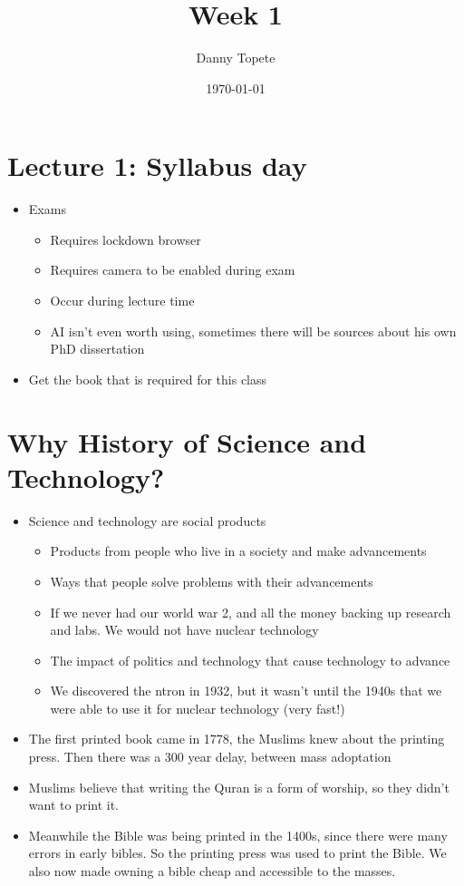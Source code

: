 \documentclass{article}
\title{Week 1}
\author{Danny Topete}
\date{\today}
\begin{document}
\maketitle

\section{Lecture 1: Syllabus day}
\begin{itemize}
  \item Exams
    \begin{itemize}
      \item Requires lockdown browser
      \item Requires camera to be enabled during exam
      \item Occur during lecture time
      \item AI isn't even worth using, sometimes
        there will be sources about his own PhD dissertation
    \end{itemize}
  \item Get the book that is required for this class
\end{itemize}

\section*{Why History of Science and Technology?}
\begin{itemize}
  \item Science and technology are social products
    \begin{itemize}
      \item Products from people who live in a society and make
        advancements
      \item Ways that people solve problems with their advancements
      \item If we never had our world war 2, and all the
        money backing up research and labs.
        We would not have nuclear technology
      \item The impact of politics and technology that
        cause technology to advance
      \item We discovered the ntron in 1932, but
        it wasn't until the 1940s that we were able to
        use it for nuclear technology (very fast!)
    \end{itemize}
  \item The first printed book came in 1778,
    the Muslims knew about the printing press.
    Then there was a 300 year delay, between mass adoptation
  \item Muslims believe that writing the Quran
    is a form of worship, so they didn't want to
    print it.
  \item Meanwhile the Bible was being printed
    in the 1400s, since there were many errors in early bibles.
    So the printing press was used to print the Bible.
    We also now made owning a bible cheap and
    accessible to the masses.
\end{itemize}
\end{document}
